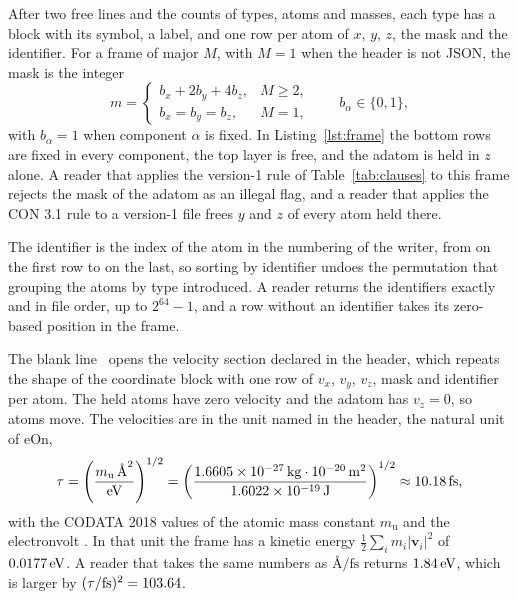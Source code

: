 \documentclass[preprint,12pt]{elsarticle}
\begin{document}
After two free lines and the counts of types, atoms and masses, each type has a block with its symbol, a label, and one row per atom of \(x\), \(y\), \(z\), the mask and the identifier.
For a frame of major \(M\), with \(M=1\) when the header is not JSON, the mask is the integer
\begin{equation}
\label{eq:mask}
m =
\begin{cases}
b_x + 2 b_y + 4 b_z, & M\ge 2,\\
b_x = b_y = b_z, & M = 1,
\end{cases}
\qquad b_\alpha\in\{0,1\},
\end{equation}
with \(b_\alpha=1\) when component \(\alpha\) is fixed.
In Listing~\ref{lst:frame} the bottom rows are fixed in every component, the top layer is free, and the adatom is held in \(z\) alone.
A reader that applies the version-1 rule of Table~\ref*{tab:clauses} to this frame rejects the mask of the adatom as an illegal flag, and a reader that applies the CON 3.1 rule to a version-1 file frees \(y\) and \(z\) of every atom held there.

The identifier is the index of the atom in the numbering of the writer, from \wkIdFirst{} on the first row to \wkIdLast{} on the last, so sorting by identifier undoes the permutation that grouping the atoms by type introduced.
A reader returns the identifiers exactly and in file order, up to \(2^{64}-1\), and a row without an identifier takes its zero-based position in the frame.

The blank line~\wkLineBlank{} opens the velocity section declared in the header, which repeats the shape of the coordinate block with one row of \(v_x\), \(v_y\), \(v_z\), mask and identifier per atom.
The held atoms have zero velocity and the adatom has \(v_z=0\), so \wkMovingAtoms{} atoms move.
The velocities are in the unit named in the header, the natural unit of eOn,
\begin{equation}
\label{eq:tau}
\tau=\left(\frac{m_{\mathrm{u}}\,\text{\AA}^{2}}{\mathrm{eV}}\right)^{1/2}
=\left(\frac{1.6605\times10^{-27}\,\mathrm{kg}\cdot 10^{-20}\,\mathrm{m}^{2}}{1.6022\times10^{-19}\,\mathrm{J}}\right)^{1/2}
\approx10.18\,\mathrm{fs},
\end{equation}
with the CODATA 2018 values of the atomic mass constant \(m_{\mathrm{u}}\) and the electronvolt \cite{tiesingaCodataRecommendedValues2021}.
In that unit the frame has a kinetic energy \(\tfrac{1}{2}\sum_i m_i\lvert\mathbf{v}_i\rvert^2\) of \(0.0177\,\mathrm{eV}\).
A reader that takes the same numbers as \(\text{\AA}/\mathrm{fs}\) returns \(1.84\,\mathrm{eV}\), which is larger by \((\tau/\mathrm{fs})^2=103.64\).
\end{document}
